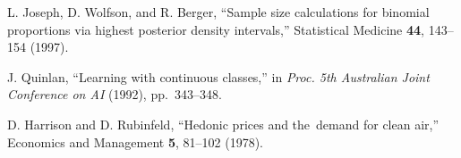 \documentclass[
11pt,%
tightenlines,%
twoside,%
onecolumn,%
nofloats,%
nobibnotes,%
nofootinbib,%
superscriptaddress,%
noshowpacs,%
centertags]%
{revtex4}
\begin{document}
\begin{thebibliography}{}
    L. Joseph, D. Wolfson, and R. Berger, ``Sample size calculations for binomial proportions via highest posterior density intervals,'' Statistical Medicine \textbf{44}, 143--154 (1997).

    J. Quinlan, ``Learning with continuous classes,'' in \emph{Proc. 5th Australian Joint Conference on AI} (1992), pp.~343--348.

    D. Harrison and D. Rubinfeld, ``Hedonic prices and the~demand for clean air,'' Economics and Management \textbf{5}, 81--102 (1978).

\end{thebibliography}
\end{document}
